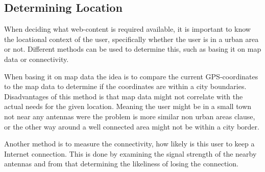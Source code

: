 \subsection{Determining Location}


When deciding what web-content is required available, it is important to know the locational context of the user, specifically whether the user is in a urban area or not. Different methods can be used to determine this, such as basing it on map data or connectivity.

When basing it on map data the idea is to compare the current GPS-coordinates to the map data to determine if the coordinates are within a city boundaries. Disadvantages of this method is that map data might not correlate with the actual needs for the given location. Meaning the user might be in a small town not near any antennas were the problem is more similar non urban areas clause, or the other way around a well connected area might not be within a city border.

Another method is to measure the connectivity, how likely is this user to keep a Internet connection. This is done by examining the signal strength of the nearby antennas and from that determining the likeliness of losing the connection.   